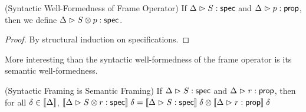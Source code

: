 \begin{prop}{(Syntactic Well-Formedness of Frame Operator)}
If ${\Delta} \vartriangleright {S} : \mathsf{spec}$ and ${\Delta} \vartriangleright {p} : {\mathsf{prop}}$, then
we define ${\Delta} \vartriangleright {{S} \otimes {p}} : \mathsf{spec}$.  
\end{prop}
\begin{proof}
  By structural induction on specifications.
\end{proof}

More interesting than the syntactic well-formedness of the frame
operator is its semantic well-formedness. 

\begin{lemma}{(Syntactic Framing is Semantic Framing)}
If ${\Delta} \vartriangleright {S} : \mathsf{spec}$ and ${\Delta} \vartriangleright {r} : {\mathsf{prop}}$, then for all $\delta \in [\![{\Delta}]\!]$, 
$[\![{{\Delta} \vartriangleright {{S} \otimes {r}} : \mathsf{spec}}]\!]\;\delta = 
{[\![{{\Delta} \vartriangleright {S} : \mathsf{spec}}]\!]\;\delta} \otimes {[\![{{\Delta} \vartriangleright {r} : {\mathsf{prop}}}]\!]\;\delta}$ \\
\end{lemma}

